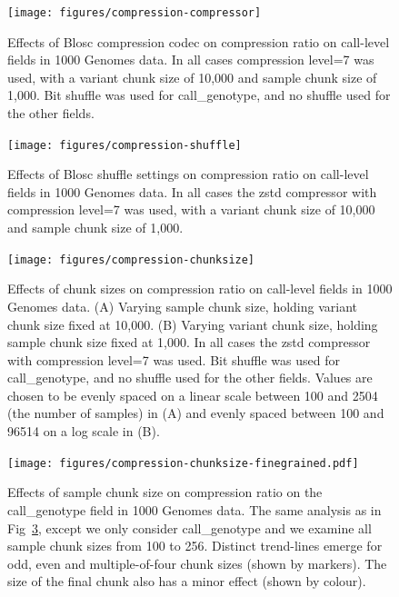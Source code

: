 \documentclass[a4paper,num-refs]{oup-contemporary}
\begin{document}
\begin{figure}[h]
\texttt{[image: figures/compression-compressor]}
\caption{Effects of Blosc compression codec on compression ratio on call-level
fields in 1000 Genomes data.
In all cases compression level=7 was used, with a variant
chunk size of 10,000 and sample chunk size of 1,000.
Bit shuffle was used for call\_genotype, and no shuffle used for the other fields.
\label{fig-compression-compressor}}
\end{figure}

\begin{figure}[h]
\texttt{[image: figures/compression-shuffle]}
\caption{Effects of Blosc shuffle settings on compression ratio on call-level
fields in 1000 Genomes data.
In all cases the zstd compressor with compression level=7 was used, with a variant
chunk size of 10,000 and sample chunk size of 1,000.
\label{fig-compression-shuffle}}
\end{figure}

\begin{figure}[h]
\texttt{[image: figures/compression-chunksize]}
\caption{Effects of chunk sizes on compression ratio on call-level
fields in 1000 Genomes data.
(A) Varying sample chunk size, holding variant chunk size fixed at 10,000.
(B) Varying variant chunk size, holding sample chunk size fixed at 1,000.
In all cases the zstd compressor with compression level=7 was used. Bit shuffle
was used for call\_genotype, and no shuffle used for the other fields.
Values are chosen to be evenly spaced on a linear scale
between 100 and 2504 (the number of samples) in (A) and
evenly spaced between 100 and 96514 on a log scale in (B).
\label{fig-compression-chunksize}}
\end{figure}

\begin{figure}[h]
\texttt{[image: figures/compression-chunksize-finegrained.pdf]}
\caption{Effects of sample chunk size on compression ratio on the call\_genotype
field in 1000 Genomes data.
The same analysis as in Fig~\ref{fig-compression-chunksize}, except we only
consider call\_genotype and we examine all sample chunk sizes from
100 to 256. Distinct trend-lines emerge for odd, even and multiple-of-four
chunk sizes (shown by markers). The size of the final chunk also has a minor
effect (shown by colour).
\label{fig-compression-chunksize-finegrained}}
\end{figure}
\end{document}
